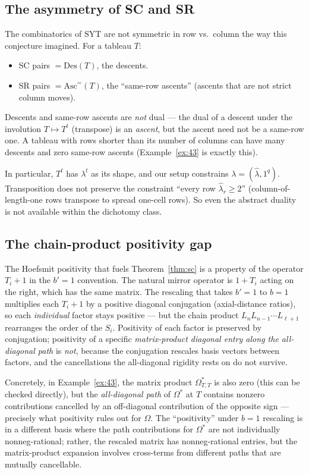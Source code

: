 \documentclass[11pt]{article}
\theoremstyle{definition}
\newcommand{\Om}{\Omega}
\newcommand{\Omstar}{\Omega^{\!*}}
\newcommand{\la}{\lambda}
\newcommand{\hla}{\hat{\lambda}}
\newcommand{\SYT}{\mathrm{SYT}}
\begin{document}
\subsection{The asymmetry of SC and SR}

The combinatorics of $\SYT$ are not symmetric in row vs.\ column the way
this conjecture imagined. For a tableau $T$:
\begin{itemize}[leftmargin=2em]
\item SC pairs $= \mathrm{Des}(T)$, the descents.
\item SR pairs $= \mathrm{Asc}^{\!=}(T)$, the ``same-row ascents''
  (ascents that are not strict column moves).
\end{itemize}
Descents and same-row ascents are \emph{not} dual --- the dual of a
descent under the involution $T \mapsto T^t$ (transpose) is an
\emph{ascent}, but the ascent need not be a same-row one. A tableau
with rows shorter than its number of columns can have many descents
and zero same-row ascents (Example~\ref{ex:43} is exactly this).

In particular, $T^t$ has $\la^t$ as its shape, and our setup constrains
$\la = (\hla, 1^q)$. Transposition does not preserve the constraint
``every row $\hla_r \ge 2$'' (column-of-length-one rows transpose to
spread one-cell rows). So even the abstract duality is not available
within the dichotomy class.

\subsection{The chain-product positivity gap}

The Hoefsmit positivity that fuels Theorem~\ref{thm:sc} is a property of
the operator $T_i + 1$ in the $b' = 1$ convention. The natural mirror
operator is $1 + T_i$ acting on the right, which has the same matrix.
The rescaling that takes $b' = 1$ to $b = 1$ multiplies each $T_i + 1$
by a positive diagonal conjugation (axial-distance ratios), so each
\emph{individual} factor stays positive --- but the chain product
$L_n L_{n-1} \cdots L_{\ell+1}$ rearranges the order of the $S_i$.
Positivity of each factor is preserved by conjugation; positivity of a
specific \emph{matrix-product diagonal entry along the all-diagonal
path} is \emph{not}, because the conjugation rescales basis vectors
between factors, and the cancellations the all-diagonal rigidity rests
on do not survive.

Concretely, in Example~\ref{ex:43}, the matrix product
$\Omstar_{T,T}$ is also zero (this can be checked directly), but the
\emph{all-diagonal path} of $\Omstar$ at $T$ contains nonzero
contributions cancelled by an off-diagonal contribution of the opposite
sign --- precisely what positivity rules out for $\Om$. The
``positivity'' under $b = 1$ rescaling is in a different basis where
the path contributions for $\Omstar$ are not individually
nonneg-rational; rather, the rescaled matrix has nonneg-rational
entries, but the matrix-product expansion involves cross-terms from
different paths that are mutually cancellable.
\end{document}

